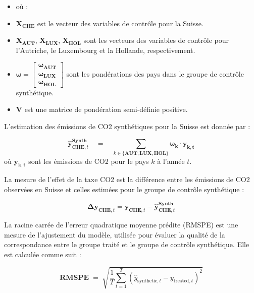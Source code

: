 \begin{itemize}
\item[] où : \vspace*{0.2cm}
   \item[] $\mathbf{X}_{\mathbf{CHE}}$ \quad est le vecteur des variables de contrôle pour la Suisse.
    \item[] $\mathbf{X}_{\mathbf{AUT}}$, $\mathbf{X}_{\mathbf{LUX}}$, $\mathbf{X}_{\mathbf{HOL}}$ \quad  sont les vecteurs des variables de contrôle pour l'Autriche, le Luxembourg et la Hollande, respectivement. \vspace*{0.2cm}
    \item[] $\mathbf{\boldsymbol{\omega}} = \begin{bmatrix} \boldsymbol{\omega}_{\mathbf{AUT}} \\ \boldsymbol{\omega}_{\mathbf{LUX}} \\ \boldsymbol{\omega}_{\mathbf{HOL}} \end{bmatrix}$ \quad  sont les pondérations des pays dans le groupe de contrôle synthétique. \vspace*{0.2cm}
    \item[] $\mathbf{V}$ \quad  est une matrice de pondération semi-définie positive.
\end{itemize}

L'estimation des émissions de CO2 synthétiques pour la Suisse est donnée par :

$$
\hat{\mathbf{y}}_{\mathbf{CHE}, t}^{\mathbf{Synth}} \quad = \quad \sum_{k \boldsymbol{\in} \{\mathbf{AUT}, \mathbf{LUX}, \mathbf{HOL}\}} \boldsymbol{\omega}_\mathbf{k} \cdot \mathbf{y}_{\mathbf{k, t}}
$$
\label{content:scm}
où $\mathbf{y}_{\mathbf{k, t}}$ sont les émissions de CO2 pour le pays $k$ à l'année $t$.


La mesure de l'effet de la taxe CO2 est la différence entre les émissions de CO2 observées en Suisse et celles estimées pour le groupe de contrôle synthétique :

$$
\boldsymbol{\Delta} \mathbf{y}_{\mathbf{CHE}, t} = \mathbf{y}_{\mathbf{CHE}, t} - \hat{\mathbf{y}}_{\mathbf{CHE}, t}^{\mathbf{Synth}}
$$


La racine carrée de l'erreur quadratique moyenne prédite (RMSPE) est une mesure de l'ajustement du modèle, utilisée pour évaluer la qualité de la correspondance entre le groupe traité et le groupe de contrôle synthétique. Elle est calculée comme suit :

$$
\textbf{RMSPE} \;   =\;  \sqrt{\frac{1}{T} \sum_{t=1}^{T} (\hat{y}_{\text{synthetic}, t} - y_{\text{treated}, t})^2}
$$
\label{content:rmspe}

